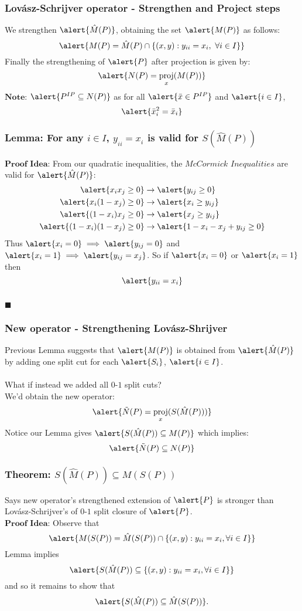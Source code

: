 \documentclass{beamer}
\DeclareMathOperator{\proj}{proj}
\begin{document}
\begin{frame}
\frametitle{Lov\'asz-Schrijver operator - Strengthen and Project steps}
We strengthen $\alert{\hat{M}(P)}$, obtaining the set $\alert{M(P)}$ as follows:
$$\alert{M(P) = \hat{M}(P) \cap \{ (x,y) : y_{ii} = x_{i},\ \forall i \in I\} } $$
Finally the strengthening of $\alert{P}$ after projection is given by:
$$\alert{N(P) = \proj_x(M(P))}$$
$\textbf{Note:}$ $\alert{P^{IP} \subseteq N(P)}$ as for all $\alert{\bar{x} \in P^{IP}}$ and $\alert{i \in I}$, 
$$\alert{\bar{x}_i^2 = \bar{x}_i}$$
\end{frame}

\begin{frame}
\frametitle{Lemma: For any $i\in I$, $y_{ii} = x_{i}$ is valid for $S(\hat{M}(P))$} 
$\textbf{Proof Idea:}$ From our quadratic inequalities, the $\textit{McCormick Inequalities}$ are valid for $\alert{\hat{M}(P)}$:
\begin{align*}
\alert{x_i x_j \geq 0} & \rightarrow \alert{y_{ij} \geq 0} \\
\alert{x_i(1-x_j)\geq 0} & \rightarrow \alert{x_i \geq y_{ij}} \\
\alert{(1-x_i)x_j \geq 0} & \rightarrow \alert{x_j \geq y_{ij}} \\
\alert{(1-x_i)(1-x_j) \geq 0} & \rightarrow \alert{1 - x_i - x_j + y_{ij}  \geq 0}
\end{align*}
Thus $\alert{x_i = 0} \implies \alert{y_{ij} = 0}$ and $\alert{x_i = 1} \implies \alert{y_{ij} = x_j}$. So if $\alert{x_i = 0}$ or $\alert{x_i = 1}$ then
$$\alert{y_{ii} = x_i}$$ \\$\blacksquare$
\end{frame}

\begin{frame}
\frametitle{New operator - Strengthening Lov\'asz-Shrijver}
Previous Lemma suggests that $\alert{M(P)}$ is obtained from $\alert{\hat{M}(P)}$ by adding one split cut for each $\alert{S_i}$, $\alert{i \in I}$.\\\ \\
What if instead we added all $0$-$1$ split cuts?\\
We'd obtain the new operator:
$$\alert{\tilde{N}(P) = \proj_x(S(\hat{M}(P)))}$$
Notice our Lemma gives $\alert{S(\hat{M}(P)) \subseteq M(P)}$ which implies:
$$\alert{\tilde{N}(P) \subseteq N(P)}$$
\end{frame}

\begin{frame}
\frametitle{Theorem: $S(\hat{M}(P)) \subseteq M(S(P))$}
Says new operator's strengthened extension of $\alert{P}$ is stronger than Lov\'asz-Schrijver's of $0$-$1$ split closure of $\alert{P}$.
\\$\textbf{Proof Idea:}$ Observe that $$\alert{M(S(P)) = \hat{M}(S(P)) \cap \{(x,y):y_{ii} = x_i, \forall i \in I\}}$$
Lemma implies $$\alert{S(\hat{M}(P)) \subseteq \{(x,y):y_{ii}=x_i, \forall i \in I \}}$$  and so it remains to show that $$\alert{S(\hat{M}(P)) \subseteq \hat{M}(S(P))}.$$ 
\end{frame}
\end{document}
